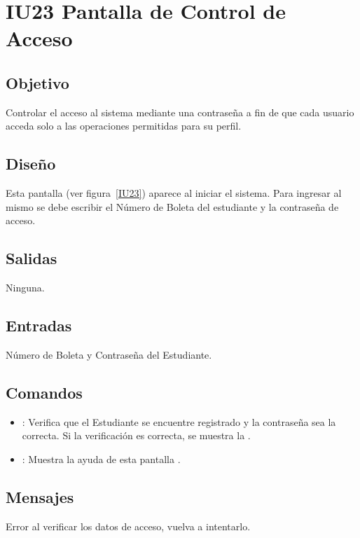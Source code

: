 \section{IU23 Pantalla de Control de Acceso}

\subsection{Objetivo}
	Controlar el acceso al sistema mediante una contraseña a fin de que cada usuario acceda solo a las operaciones permitidas para su perfil.

\subsection{Diseño}
	Esta pantalla  (ver figura~\ref{IU23}) aparece al iniciar el sistema. Para ingresar al mismo se debe escribir el Número de Boleta del estudiante y la contraseña de acceso. 


\subsection{Salidas}

	Ninguna.

\subsection{Entradas}
Número de Boleta y Contraseña del Estudiante.

\subsection{Comandos}
\begin{itemize}
	\item {}: Verifica que el Estudiante se encuentre registrado y la contraseña sea la correcta. Si la verificación es correcta, se muestra la .
	\item {}: Muestra la ayuda de esta pantalla .
\end{itemize}

\subsection{Mensajes}

\begin{Citemize}
	\item Error al verificar los datos de acceso, vuelva a intentarlo.
\end{Citemize}

